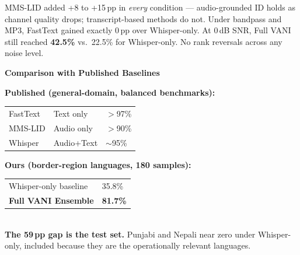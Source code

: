 \documentclass[11pt,a4paper]{article}
\begin{document}
\vspace{3pt}
\begin{tcolorbox}[enhanced,colback=LTeal,colframe=Teal,arc=4pt,boxrule=1pt,
  left=7pt,right=7pt,top=5pt,bottom=5pt]
\small MMS-LID added +8 to +15\,pp in \textit{every} condition --- audio-grounded ID holds as channel quality drops; transcript-based methods do not. Under bandpass and MP3, FastText gained exactly 0\,pp over Whisper-only. At 0\,dB SNR, Full VANI still reached \textbf{42.5\%} vs.\ 22.5\% for Whisper-only. No rank reversals across any noise level.
\end{tcolorbox}

\vspace{5pt}

\textbf{\color{Purple}\large Comparison with Published Baselines}

\vspace{3pt}
\noindent
\begin{minipage}[t]{0.48\textwidth}
\begin{tcolorbox}[enhanced,colback=LGray,colframe=MGray,arc=4pt,boxrule=0.8pt,
  left=7pt,right=7pt,top=5pt,bottom=5pt]
\small\textbf{Published (general-domain, balanced benchmarks):}\\[3pt]
\begin{tabular}{@{}lll@{}}
FastText & Text only & $>$97\%\\
MMS-LID & Audio only & $>$90\%\\
Whisper & Audio+Text & $\sim$95\%\\
\end{tabular}
\end{tcolorbox}
\end{minipage}\hfill
\begin{minipage}[t]{0.48\textwidth}
\begin{tcolorbox}[enhanced,colback=SkyBg,colframe=Royal,arc=4pt,boxrule=1.5pt,
  left=7pt,right=7pt,top=5pt,bottom=5pt]
\small\textbf{Ours (border-region languages, 180 samples):}\\[3pt]
\begin{tabular}{@{}ll@{}}
Whisper-only baseline & 35.8\%\\
\textbf{Full VANI Ensemble} & \textbf{81.7\%}\\
\end{tabular}\\[3pt]
\textbf{The 59\,pp gap is the test set.} Punjabi and Nepali near zero under Whisper-only, included because they are the operationally relevant languages.
\end{tcolorbox}
\end{minipage}
\end{document}
